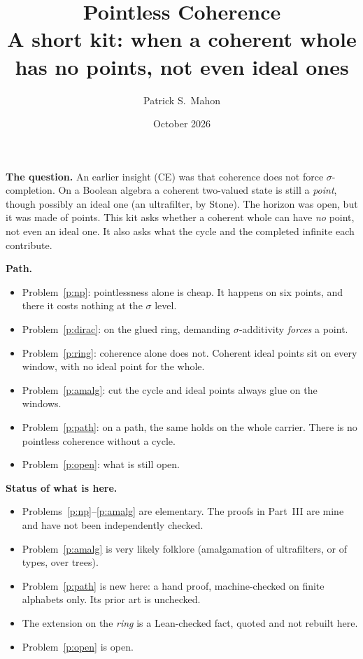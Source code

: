 \documentclass[11pt]{article}
\title{Pointless Coherence\\[2pt]\large A short kit: when a coherent whole has no points, not even ideal ones}
\author{Patrick S.\ Mahon}
\date{October 2026}
\theoremstyle{definition}
\theoremstyle{remark}
\newcommand{\bp}[1]{\begin{mdframed}[backgroundcolor=black!4,linewidth=0.4pt]#1\end{mdframed}}
\begin{document}
\maketitle

\bp{\textbf{The question.} An earlier insight (CE) was that coherence does not
force $\sigma$-completion. On a Boolean algebra a coherent two-valued state is
still a \emph{point}, though possibly an ideal one (an ultrafilter, by Stone).
The horizon was open, but it was made of points. This kit asks whether a
coherent whole can have \emph{no} point, not even an ideal one. It also asks what
the cycle and the completed infinite each contribute.

\textbf{Path.}
\begin{itemize}[nosep]
  \item Problem~\ref{p:np}: pointlessness alone is cheap. It happens on six
    points, and there it costs nothing at the $\sigma$ level.
  \item Problem~\ref{p:dirac}: on the glued ring, demanding $\sigma$-additivity
    \emph{forces} a point.
  \item Problem~\ref{p:ring}: coherence alone does not. Coherent ideal points
    sit on every window, with no ideal point for the whole.
  \item Problem~\ref{p:amalg}: cut the cycle and ideal points always glue on the
    windows.
  \item Problem~\ref{p:path}: on a path, the same holds on the whole carrier.
    There is no pointless coherence without a cycle.
  \item Problem~\ref{p:open}: what is still open.
\end{itemize}

\textbf{Status of what is here.}
\begin{itemize}[nosep]
  \item Problems~\ref{p:np}--\ref{p:amalg} are elementary. The proofs in Part~III
    are mine and have not been independently checked.
  \item Problem~\ref{p:amalg} is very likely folklore (amalgamation of
    ultrafilters, or of types, over trees).
  \item Problem~\ref{p:path} is new here: a hand proof, machine-checked on finite
    alphabets only. Its prior art is unchecked.
  \item The extension on the \emph{ring} is a Lean-checked fact, quoted and not
    rebuilt here.
  \item Problem~\ref{p:open} is open.
\end{itemize}}
\end{document}
